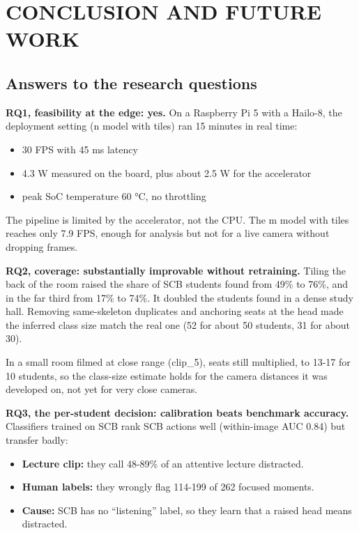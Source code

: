 \chapter{CONCLUSION AND FUTURE WORK}

\section{Answers to the research questions}

\textbf{RQ1, feasibility at the edge: yes.} On a Raspberry Pi 5 with a Hailo-8, the deployment setting (n model with tiles) ran 15 minutes in real time:

\begin{itemize}
\tightlist
\item
  30 FPS with 45 ms latency
\item
  4.3 W measured on the board, plus about 2.5 W for the accelerator
\item
  peak SoC temperature 60 °C, no throttling
\end{itemize}

The pipeline is limited by the accelerator, not the CPU. The m model with tiles reaches only 7.9 FPS, enough for analysis but not for a live camera without dropping frames.

\textbf{RQ2, coverage: substantially improvable without retraining.} Tiling the back of the room raised the share of SCB students found from 49\% to 76\%, and in the far third from 17\% to 74\%. It doubled the students found in a dense study hall. Removing same-skeleton duplicates and anchoring seats at the head made the inferred class size match the real one (52 for about 50 students, 31 for about 30).

In a small room filmed at close range (clip\_5), seats still multiplied, to 13-17 for 10 students, so the class-size estimate holds for the camera distances it was developed on, not yet for very close cameras.

\textbf{RQ3, the per-student decision: calibration beats benchmark accuracy.} Classifiers trained on SCB rank SCB actions well (within-image AUC 0.84) but transfer badly:

\begin{itemize}
\tightlist
\item
  \textbf{Lecture clip:} they call 48-89\% of an attentive lecture distracted.
\item
  \textbf{Human labels:} they wrongly flag 114-199 of 262 focused moments.
\item
  \textbf{Cause:} SCB has no ``listening'' label, so they learn that a raised head means distracted.
\end{itemize}

